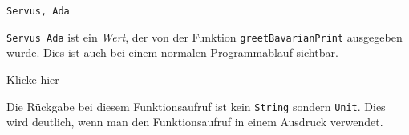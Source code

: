 \label{f5b9d0e6-d957-4b8f-85db-ae47ad655cfa}
\begin{Shaded}
\begin{Highlighting}[]
\OperatorTok{(}\OperatorTok{)}
\end{Highlighting}
\end{Shaded}

\begin{verbatim}
Servus, Ada
\end{verbatim}

\label{af4bf4b8-45c3-433e-b275-45d5034a8cea}
\texttt{Servus\ Ada} ist ein \emph{Wert}, der von der Funktion
\texttt{greetBavarianPrint} ausgegeben wurde. Dies ist auch bei einem
normalen Programmablauf sichtbar.

\href{https://pl.kotl.in/Ji1uTRnRD}{Klicke hier}

Die Rückgabe bei diesem Funktionsaufruf ist kein \texttt{String} sondern
\texttt{Unit}. Dies wird deutlich, wenn man den Funktionsaufruf in einem
Ausdruck verwendet.

\label{4bdfb012-27d3-412a-b557-2323d8329a91}
\begin{Shaded}
\begin{Highlighting}[]
\OperatorTok{(}\OperatorTok{)} \OperatorTok{+} 
\end{Highlighting}
\end{Shaded}

